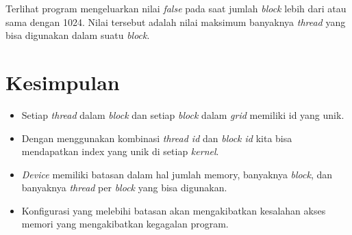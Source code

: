 Terlihat program mengeluarkan nilai \textit{false} pada saat jumlah \textit{block} lebih dari atau sama dengan 1024.  Nilai tersebut adalah nilai maksimum banyaknya \textit{thread} yang bisa digunakan dalam suatu \textit{block}.

\section{Kesimpulan}

\begin{itemize}
	\item Setiap \textit{thread} dalam \textit{block} dan setiap \textit{block} dalam \textit{grid} memiliki id yang unik.
	\item Dengan menggunakan kombinasi \textit{thread id} dan \textit{block id} kita bisa mendapatkan index yang unik di setiap \textit{kernel}.
	\item \textit{Device} memiliki batasan dalam hal jumlah memory, banyaknya \textit{block}, dan banyaknya \textit{thread} per \textit{block} yang bisa digunakan.
	\item Konfigurasi yang melebihi batasan akan mengakibatkan kesalahan akses memori yang mengakibatkan kegagalan program.  
\end{itemize}
